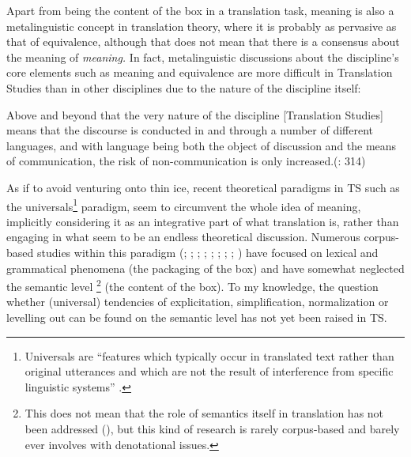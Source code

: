 Apart from being the content of the box in a translation task, meaning is also a metalinguistic concept in translation theory, where it is probably as pervasive as that of equivalence, although that does not mean that there is a consensus about the meaning of \textit{meaning.} In fact, metalinguistic discussions about the discipline’s core elements such as meaning and equivalence are more difficult in Translation Studies than in other disciplines due to the nature of the discipline itself: 



Above and beyond that the very nature of the discipline [Translation Studies] means that the discourse is conducted in and through a number of different languages, and with language being both the object of discussion and the means of communication, the risk of non-communication is only increased.(\citealt{Snell-Hornby 2007}: 314)



As if to avoid venturing onto thin ice, recent theoretical paradigms in TS such as the universals\footnote{Universals are “features which typically occur in translated text rather than original utterances and which are not the result of interference from specific linguistic systems” \citep[243]{baker_corpus_1993}.} paradigm, seem to circumvent the whole idea of meaning, implicitly considering it as an integrative part of what translation is, rather than engaging in what seem to be an endless theoretical discussion. Numerous corpus-based studies within this paradigm (\citealt{poyatos_punctuation_1997}; \citealt{laviosa_core_1998, laviosa_corpus-based_2002}; \citealt{olohan_strange_2000}; \citealt{Olohan & Baker 2000}; \citealt{baker_corpus-based_2004}; \citealt{bernardini_practice_2011}; \citealt{delaere_is_2012}; \citealt{oakes_lexical_2012}; \citealt{kruger_corpus-based_2012}) have focused on lexical and grammatical phenomena (the packaging of the box) and have somewhat neglected the semantic level \citep[28]{laviosa_corpus-based_2002}\footnote{This does not mean that the role of semantics itself in translation has not been addressed (\citealt{lewandowska-tomasczyk_specification_2010}), but this kind of research is rarely corpus-based and barely ever involves with denotational issues.} (the content of the box). To my knowledge, the question whether (universal) tendencies of explicitation, simplification, normalization or levelling out can be found on the semantic level has not yet been raised in TS.



